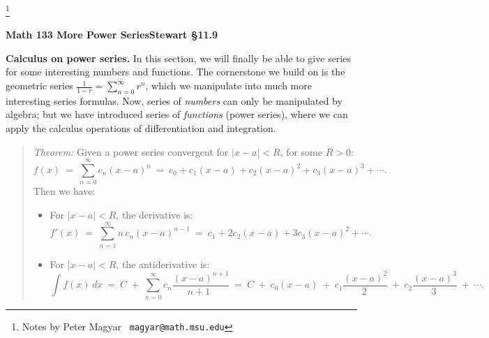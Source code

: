 \documentclass[11pt]{article}
\begin{document}
\footnote[0]{Notes by Peter Magyar \ {\tt magyar@math.msu.edu}}
\vspace{-1em}

\centerline{\bf Math 133\hspace{1.5em} \hfill{\Large\bf
More Power Series}\hfill Stewart \S11.9}
\vspace{1em}

\noindent 
{\bf Calculus on power series.}
In this section, we will finally be able to give series for some interesting numbers and functions.  The cornerstone we build on is the geometric series $\frac1{1-r}=\sum_{n=0}^\infty r^n$, which we manipulate into much more interesting series formulas. Now, series of {\it numbers} can only be manipulated by algebra; 
but we have introduced series of {\it functions} (power series), 
where we can apply the calculus operations of differentiation and integration.

\begin{quote}
{\it Theorem:} Given a power series convergent for 
$|x{-}a|<R$, for some $R>0$:
$$
f(x) 
\ =\
\sum_{n=0}^\infty c_n (x{-}a)^n
\ =\
c_0 + c_1(x{-}a) + c_2(x{-}a)^2+ c_3(x{-}a)^3 +\cdots .
$$
Then we have:
\begin{itemize}
\item For $|x{-}a|<R$, the derivative is:
$$
f'(x) 
\ =\
\sum_{n=1}^\infty n\,c_n (x{-}a)^{n-1}
\ =\
c_1 + 2c_2(x{-}a)+ 3c_3(x{-}a)^2 +\cdots .
$$

\item For $|x{-}a|<R$, the antiderivative is:
$$
\int\!\! f(x) \, dx 
\ =\
C \ +\ 
\sum_{n=0}^\infty c_n \frac{(x{-}a)^{n+1}}{n{+}1\ \ }
\ = \ C\ +\  c_0 (x{-}a) \ +\  c_1\frac{(x{-}a)^2}{2 \ }\ +\  c_2\frac{(x{-}a)^3}{3 \ } \ +\ \cdots .
$$
\end{itemize}

\end{quote}
\end{document}
